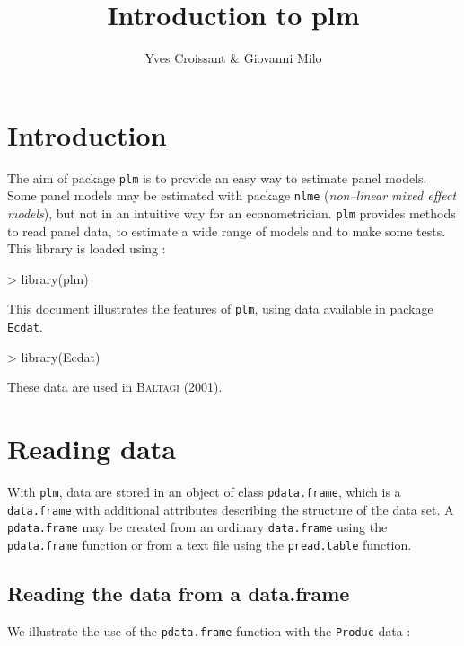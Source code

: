 \documentclass{article}
\title{Introduction to plm}
\author{Yves Croissant & Giovanni Milo}
\begin{document}
\maketitle


\section{Introduction}

The aim of package \texttt{plm} is to provide an easy way to estimate
panel models. Some panel models may be estimated with package \texttt{nlme}
(\textit{non--linear mixed effect models}), but not in an intuitive
way for an econometrician.
\texttt{plm} provides methods to read panel data, to estimate a wide
range of models and to make some tests. 
This library is loaded using :

\begin{Schunk}
\begin{Sinput}
> library(plm)
\end{Sinput}
\end{Schunk}

This document illustrates the features  of  \texttt{plm}, using
data available in  package \texttt{Ecdat}. 

\begin{Schunk}
\begin{Sinput}
> library(Ecdat)
\end{Sinput}
\end{Schunk}

These data are used in  \textsc{Baltagi} (2001).

\section{Reading data}

With \texttt{plm}, data are stored in an object of class
\texttt{pdata.frame},  which is a \texttt{data.frame} with additional
attributes describing the structure of the data set.
A \texttt{pdata.frame} may be created from an ordinary \texttt{data.frame}
using the \texttt{pdata.frame} function or from a text file using the
\texttt{pread.table} function.


\subsection{Reading the data from a data.frame}

We illustrate the use of the \texttt{pdata.frame} function with the
\texttt{Produc} data :
\end{document}
